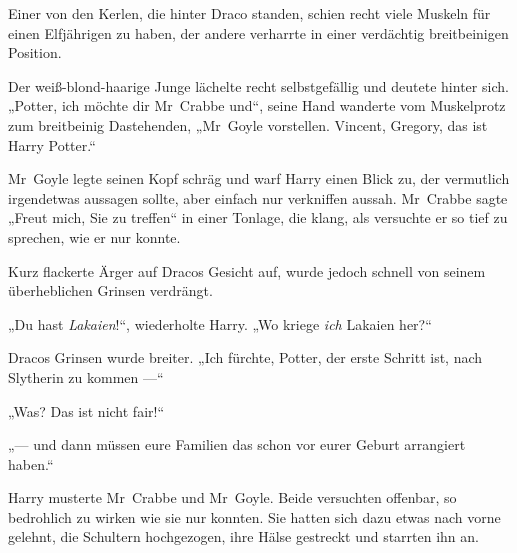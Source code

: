 Einer von den Kerlen, die hinter Draco standen, schien recht viele Muskeln für einen Elfjährigen zu haben, der andere verharrte in einer verdächtig breitbeinigen Position.

Der weiß-blond-haarige Junge lächelte recht selbstgefällig und deutete hinter sich.
„Potter, ich möchte dir Mr~Crabbe und“, seine Hand wanderte vom Muskelprotz zum breitbeinig Dastehenden,
„Mr~Goyle vorstellen. Vincent, Gregory, das ist Harry Potter.“

Mr~Goyle legte seinen Kopf schräg und warf Harry einen Blick zu, der vermutlich irgendetwas aussagen sollte, aber einfach nur verkniffen aussah. Mr~Crabbe sagte
„Freut mich, Sie zu treffen“ in einer Tonlage, die klang, als versuchte er so tief zu sprechen, wie er nur konnte.

Kurz flackerte Ärger auf Dracos Gesicht auf, wurde jedoch schnell von seinem überheblichen Grinsen verdrängt.

„Du hast \emph{Lakaien}!“, wiederholte Harry.
„Wo kriege \emph{ich} Lakaien her?“

Dracos Grinsen wurde breiter.
„Ich fürchte, Potter, der erste Schritt ist, nach Slytherin zu kommen —“

„Was? Das ist nicht fair!“

„— und dann müssen eure Familien das schon vor eurer Geburt arrangiert haben.“

Harry musterte Mr~Crabbe und Mr~Goyle. Beide versuchten offenbar, so bedrohlich zu wirken wie sie nur konnten. Sie hatten sich dazu etwas nach vorne gelehnt, die Schultern hochgezogen, ihre Hälse gestreckt und starrten ihn an.

